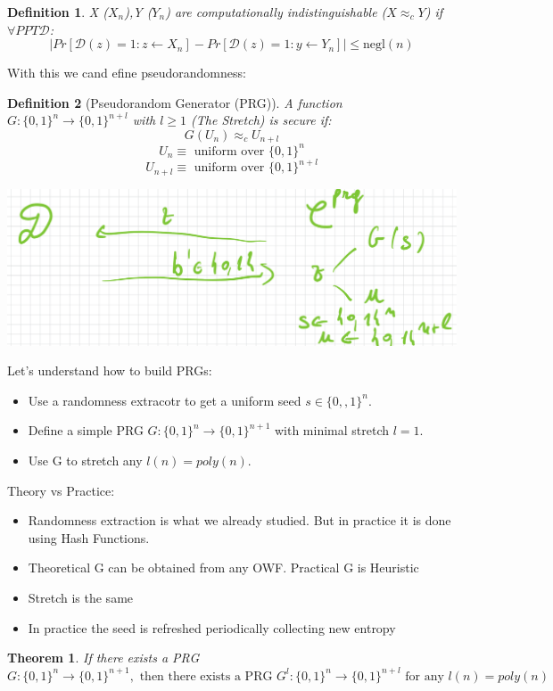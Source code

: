 \documentclass[11pt, a4paper]{article}
\newtheorem{thm}{Theorem}
\newtheorem{defn}{Definition}
\begin{document}
\begin{defn}
    X ($X_n$),Y ($Y_n$) are computationally indistinguishable ($ X \approx_c Y$) if $\forall PPT \mathcal{D}$:
    $$|Pr[\mathcal{D}(z)=1 : z \leftarrow X_n] - Pr[\mathcal{D}(z)=1 : y \leftarrow Y_n]| \leq \text{negl}(n)$$
\end{defn}
With this we cand efine pseudorandomness:
\begin{defn}[Pseudorandom Generator (PRG)]
    A function $G: \{0,1\}^n \rightarrow \{0,1\}^{n+l}$ with $l \geq 1$ (The Stretch) is secure if:
    $$G(U_n) \approx_c U_{n+l}$$
    $$U_n \equiv \text{ uniform over } \{0,1\}^n$$
    $$U_{n+l} \equiv \text{ uniform over } \{0,1\}^{n+l}$$
\end{defn}
\begin{center}
    \includegraphics[scale=0.4]{img/Comp_sec/pseudogen.png}
\end{center}
Let's understand how to build PRGs:
\begin{itemize}
    \item Use a randomness extracotr to get a uniform seed $s \in \{0,,1\}^n$.
    \item Define a simple PRG $G:\{0,1\}^n \rightarrow \{0,1\}^{n+1}$ with minimal stretch $l = 1$.
    \item Use G to stretch any $l(n) = poly(n)$.
\end{itemize}
Theory vs Practice:
\begin{itemize}
    \item Randomness extraction is what we already studied. But in practice it is done using Hash Functions.
    \item Theoretical G can be obtained from any OWF. Practical G is Heuristic
    \item Stretch is the same
    \item In practice the seed is refreshed periodically collecting new entropy
\end{itemize}
\begin{thm}
    If there exists a PRG $G: \{0,1\}^n \rightarrow \{0,1\}^{n+1},\text{ then there exists a PRG } G^l : \{0,1\}^n \rightarrow \{0,1\}^{n+l} \text{ for any } l(n)=poly(n) $
\end{thm}
\end{document}
